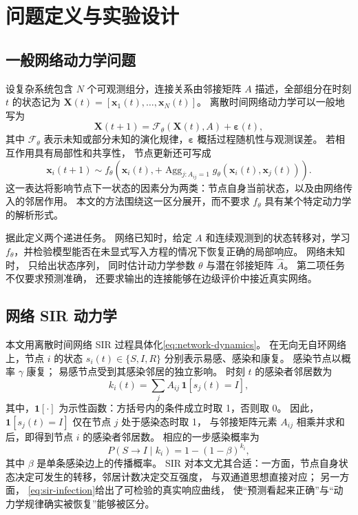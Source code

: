 \section{问题定义与实验设计}

\subsection{一般网络动力学问题}

设复杂系统包含 $N$ 个可观测组分，连接关系由邻接矩阵 $A$ 描述，全部组分在时刻 $t$ 的状态记为 $\mathbf X(t)=[\mathbf x_1(t),\ldots,\mathbf x_N(t)]$。
离散时间网络动力学可以一般地写为
\begin{equation}
\mathbf X(t+1)=\mathcal F_{\theta}\!\left(\mathbf X(t),A\right)+\boldsymbol\varepsilon(t),
\label{eq:network-dynamics}
\end{equation}
其中 $\mathcal F_{\theta}$ 表示未知或部分未知的演化规律，$\boldsymbol\varepsilon$ 概括过程随机性与观测误差。
若相互作用具有局部性和共享性，
节点更新还可写成
\begin{equation}
\mathbf x_i(t+1)\sim
f_{\theta}\!\left(
\mathbf x_i(t),+\operatorname{Agg}_{j:A_{ij}=1}
g_{\theta}(\mathbf x_i(t),\mathbf x_j(t))
\right).
\label{eq:local-interaction}
\end{equation}
这一表达将影响节点下一状态的因素分为两类：节点自身当前状态，以及由网络传入的邻居作用。
本文的方法围绕这一区分展开，而不要求 $f_{\theta}$ 具有某个特定动力学的解析形式。

据此定义两个递进任务。
网络已知时，给定 $A$ 和连续观测到的状态转移对，学习 $f_{\theta}$，并检验模型能否在未显式写入方程的情况下恢复正确的局部响应。
网络未知时，
只给出状态序列，
同时估计动力学参数 $\theta$ 与潜在邻接矩阵 $\hat A$。
第二项任务不仅要求预测准确，
还要求输出的连接能够在边级评价中接近真实网络。

\subsection{网络 SIR 动力学}

本文用离散时间网络 SIR 过程具体化\cref{eq:network-dynamics}。
在无向无自环网络上，节点 $i$ 的状态 $s_i(t)\in\{S,I,R\}$ 分别表示易感、感染和康复。
感染节点以概率 $\gamma$ 康复；
易感节点受到其感染邻居的独立影响。
时刻 $t$ 的感染者邻居数为
\begin{equation}
k_i(t)=\sum_j A_{ij}\,\mathbf{1}[s_j(t)=I],
\end{equation}
其中，$\mathbf{1}[\cdot]$ 为示性函数：方括号内的条件成立时取 1，否则取 0。
因此，$\mathbf{1}[s_j(t)=I]$ 仅在节点 $j$ 处于感染态时取 1，
与邻接矩阵元素 $A_{ij}$ 相乘并求和后，即得到节点 $i$ 的感染者邻居数。
相应的一步感染概率为
\begin{equation}
P(S\to I\mid k_i)=1-(1-\beta)^{k_i},
\label{eq:sir-infection}
\end{equation}
其中 $\beta$ 是单条感染边上的传播概率。
SIR 对本文尤其合适：一方面，节点自身状态决定可发生的转移，邻居计数决定交互强度，
与双通道思想直接对应；
另一方面，
\cref{eq:sir-infection}给出了可检验的真实响应曲线，
使“预测看起来正确”与“动力学规律确实被恢复”能够被区分。

